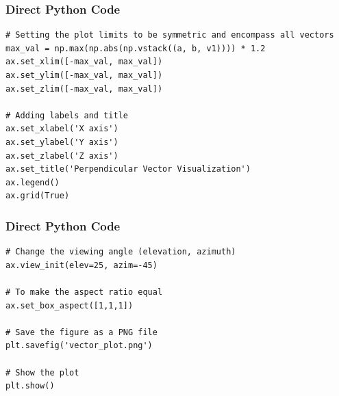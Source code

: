 \documentclass{beamer}
\begin{document}
\begin{frame}[fragile]
\frametitle{Direct Python Code}
\begin{lstlisting}
# Setting the plot limits to be symmetric and encompass all vectors
max_val = np.max(np.abs(np.vstack((a, b, v1)))) * 1.2
ax.set_xlim([-max_val, max_val])
ax.set_ylim([-max_val, max_val])
ax.set_zlim([-max_val, max_val])

# Adding labels and title
ax.set_xlabel('X axis')
ax.set_ylabel('Y axis')
ax.set_zlabel('Z axis')
ax.set_title('Perpendicular Vector Visualization')
ax.legend()
ax.grid(True)
\end{lstlisting}
\end{frame}

\begin{frame}[fragile]
\frametitle{Direct Python Code}
\begin{lstlisting}
# Change the viewing angle (elevation, azimuth)
ax.view_init(elev=25, azim=-45)

# To make the aspect ratio equal
ax.set_box_aspect([1,1,1]) 

# Save the figure as a PNG file
plt.savefig('vector_plot.png')

# Show the plot
plt.show()


\end{lstlisting}
\end{frame}
\end{document}
